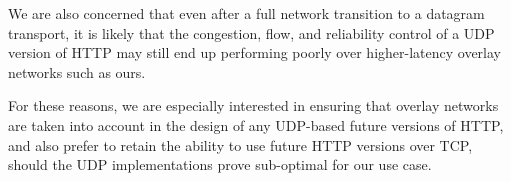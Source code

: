 \documentclass[letterpaper,11pt]{llncs}
\begin{document}
We are also concerned that even after a full network transition to a datagram
transport, it is likely that the congestion, flow, and reliability control of
a UDP version of HTTP may still end up performing poorly over higher-latency
overlay networks such as ours.

For these reasons, we are especially interested in ensuring that overlay
networks are taken into account in the design of any UDP-based future versions
of HTTP, and also prefer to retain the ability to use future HTTP versions
over TCP, should the UDP implementations prove sub-optimal for our use case.



 

\clearpage
\appendix
\end{document}
